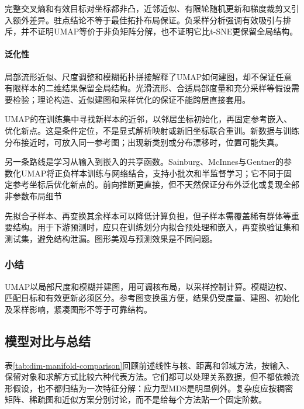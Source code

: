 完整交叉熵和有效目标对坐标都非凸，近邻近似、有限轮随机更新和梯度裁剪又引入额外差异。驻点结论不等于最佳拓扑布局保证。负采样分析强调有效吸引与排斥，并不证明UMAP等价于非负矩阵分解，也不证明它比t-SNE更保留全局结构。

\paragraph{泛化性}

局部流形近似、尺度调整和模糊拓扑拼接解释了UMAP如何建图，却不保证任意有限样本的二维结果保留全局结构。光滑流形、合适局部度量和充分采样等假设需要检验；理论构造、近似建图和采样优化的保证不能跨层直接套用。

UMAP的在训练集中寻找新样本的近邻，以邻居坐标初始化，再固定参考嵌入、优化新点。这是条件定位，不是显式解析映射或新旧坐标联合重训。新数据与训练分布接近时，可放入同一参考图；出现新类别或分布漂移时，位置可能失真。

另一条路线是学习从输入到嵌入的共享函数。Sainburg、McInnes与Gentner的参数化UMAP将正负样本训练与网络结合，支持小批次和半监督学习；它不同于固定参考坐标后优化新点的。前向推断更直接，但不天然保证分布外泛化或复现全部非参数布局细节

先拟合子样本、再变换其余样本可以降低计算负担，但子样本需覆盖稀有群体等重要结构。用于下游预测时，应只在训练划分内拟合预处理和嵌入，再变换验证集和测试集，避免结构泄漏。图形美观与预测效果是不同问题。

\subsubsection{小结}

UMAP以局部尺度和模糊并建图，用可调核布局，以采样控制计算。模糊边权、匹配目标和有效更新必须区分。参考图变换虽方便，结果仍受度量、建图、初始化及采样影响，紧凑图形不等于可靠结构。

\subsection{模型对比与总结}
\label{sec:dim-manifold-comparison}
\label{sec:dim-neighbors-comparison}

表\ref{tab:dim-manifold-comparison}回顾前述线性与核、距离和邻域方法，按输入、保留对象和求解方式比较六种代表方法。它们都可以处理关系数据，但不都依赖流形假设，也不都归结为一次特征分解：应力型MDS是明显例外。复杂度应按稠密矩阵、稀疏图和近似方案分别讨论，而不是给每个方法贴一个固定阶数。

